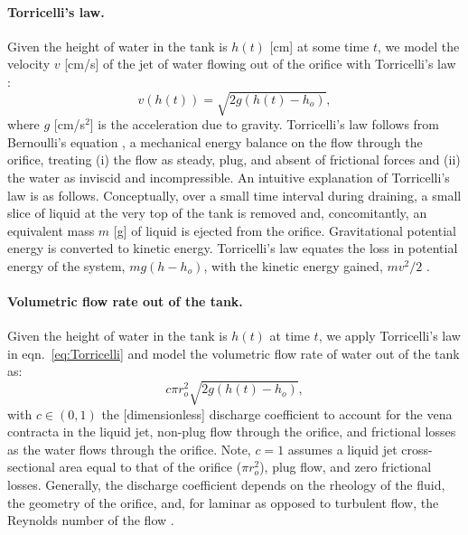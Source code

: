 \documentclass[openacc]{rsproca_new}%
\begin{document}
\paragraph{Torricelli's law.}
Given the height of water in the tank is $h(t)$ [cm] at some time $t$, we model the velocity $v$ [cm/s] of the jet of water flowing out of the orifice with Torricelli's law \cite{d2021torricelli}:
\begin{equation}
	v\left(h(t) \right)=  \sqrt{2 g(h(t)-h_o)}, \label{eq:Torricelli}
\end{equation} where $g$ [cm/s$^2$] is the acceleration due to gravity. Torricelli's law follows from Bernoulli's equation \cite{welty2020fundamentals}, a mechanical energy balance on the flow through the orifice, treating (i) the flow as steady, plug, and absent of frictional forces and (ii) the water as inviscid and incompressible.
An intuitive explanation of Torricelli's law is as follows. 
Conceptually, over a small time interval during draining, a small slice of liquid at the very top of the tank is removed and, concomitantly, an equivalent mass $m$ [g] of liquid is ejected from the orifice.
Gravitational potential energy is converted to kinetic energy. 
Torricelli's law equates the loss in potential energy of the system, $m g(h-h_o)$, with the kinetic energy gained, $m v^2/2$ \cite{groetsch1993inverse,driver1998torricelli,williams2021vessel}. 

\paragraph{Volumetric flow rate out of the tank.} Given the height of water in the tank is $h(t)$ at time $t$, we apply Torricelli's law in eqn.~\ref{eq:Torricelli} and model the volumetric flow rate of water out of the tank as:
\begin{equation}
	c \pi r_o^2 \sqrt{2 g(h(t)-h_o)}, \label{eq:outletflow}
\end{equation}
with $c\in(0,1)$ the [dimensionless] discharge coefficient to account for the vena contracta in the liquid jet, non-plug flow through the orifice, and frictional losses as the water flows through the orifice. 
Note, $c=1$ assumes a liquid jet cross-sectional area equal to that of the orifice ($\pi r_o^2$), plug flow, and zero frictional losses.
Generally, the discharge coefficient depends on the rheology of the fluid, the geometry of the orifice, and, for laminar as opposed to turbulent flow, the Reynolds number of the flow \cite{teoman2022discharge}. 
\cite{horsch2020simple,teoman2022discharge,hicks2014determining,blasone2015discharge,lienhard1984velocity,wadhwa2021study}
\end{document}
